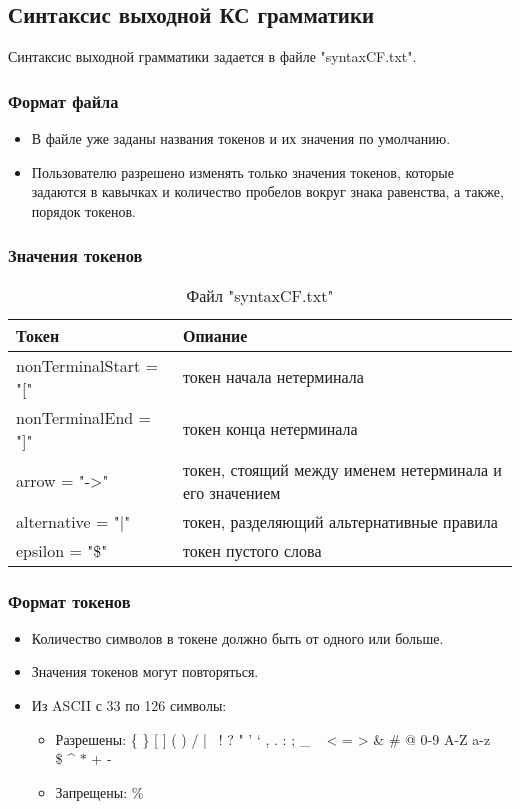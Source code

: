 \documentclass[12pt]{article}
\begin{document}
    \subsection{Синтаксис выходной КС грамматики}

    Синтаксис выходной грамматики задается в файле "syntaxCF.txt".

    \subsubsection*{Формат файла}
    \begin{itemize}
        \item В файле уже заданы названия токенов и их значения по умолчанию.
        \item Пользователю разрешено изменять только значения токенов, которые задаются в кавычках и количество пробелов вокруг знака равенства, а также, порядок токенов.
    \end{itemize}

    \subsubsection*{Значения токенов}
    \begin{table}[hbt!]
        \begin{tabular}{|l|l|}
            \hline
            Токен & Опиание \\
            \hline
            nonTerminalStart = "[" & токен начала нетерминала \\
            nonTerminalEnd = "]" & токен конца нетерминала \\
            arrow = "->" & токен, стоящий между именем нетерминала и его значением \\
            alternative = "$|$" & токен, разделяющий альтернативные правила \\
            epsilon = "\$" & токен пустого слова \\
            \hline
        \end{tabular}
        \caption{Файл "syntaxCF.txt"}
    \end{table}

    \subsubsection*{Формат токенов}
    \begin{itemize}
        \item Количество символов в токене должно быть от одного или больше.
        \item Значения токенов могут повторяться.
        \item Из ASCII с 33 по 126 символы:
        \begin{itemize}
            \item Разрешены:   \{ \} [ ] ( ) / | \ ! ? " ' ` , . : ; \_ ~ < = > \& \# @ 0-9 A-Z a-z\\ \$ \^{} $\ast$ + -
            \item Запрещены:  \%
        \end{itemize}
    \end{itemize}
\end{document}

